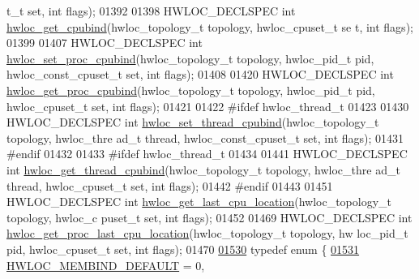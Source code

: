 \begin{DoxyCode}
      t\_t \textcolor{keyword}{set}, \textcolor{keywordtype}{int} flags);
01392 
01398 HWLOC\_DECLSPEC \textcolor{keywordtype}{int} \hyperlink{a00049_gab52f83ab16eac465da55e16bdd30df77}{hwloc_get_cpubind}(hwloc\_topology\_t topology, hwloc\_cpuset\_t \textcolor{keyword}{se
      t}, \textcolor{keywordtype}{int} flags);
01399 
01407 HWLOC\_DECLSPEC \textcolor{keywordtype}{int} \hyperlink{a00049_gac0ef3510b4e9c1273029ecf94e8c9686}{hwloc_set_proc_cpubind}(hwloc\_topology\_t topology, hwloc\_pid\_t 
      pid, hwloc\_const\_cpuset\_t \textcolor{keyword}{set}, \textcolor{keywordtype}{int} flags);
01408 
01420 HWLOC\_DECLSPEC \textcolor{keywordtype}{int} \hyperlink{a00049_gaa1373a002b9a0a87eb002e26c590f2da}{hwloc_get_proc_cpubind}(hwloc\_topology\_t topology, hwloc\_pid\_t 
      pid, hwloc\_cpuset\_t \textcolor{keyword}{set}, \textcolor{keywordtype}{int} flags);
01421 
01422 \textcolor{preprocessor}{#ifdef hwloc\_thread\_t}
01423 \textcolor{preprocessor}{}
01430 HWLOC\_DECLSPEC \textcolor{keywordtype}{int} \hyperlink{a00049_gaab65c34a0bc19c5a823f824543cedbd4}{hwloc_set_thread_cpubind}(hwloc\_topology\_t topology, hwloc\_thre
      ad\_t thread, hwloc\_const\_cpuset\_t \textcolor{keyword}{set}, \textcolor{keywordtype}{int} flags);
01431 \textcolor{preprocessor}{#endif}
01432 \textcolor{preprocessor}{}
01433 \textcolor{preprocessor}{#ifdef hwloc\_thread\_t}
01434 \textcolor{preprocessor}{}
01441 HWLOC\_DECLSPEC \textcolor{keywordtype}{int} \hyperlink{a00049_ga089cecfdb9a50e5c5cd1b6ff17352d42}{hwloc_get_thread_cpubind}(hwloc\_topology\_t topology, hwloc\_thre
      ad\_t thread, hwloc\_cpuset\_t \textcolor{keyword}{set}, \textcolor{keywordtype}{int} flags);
01442 \textcolor{preprocessor}{#endif}
01443 \textcolor{preprocessor}{}
01451 HWLOC\_DECLSPEC \textcolor{keywordtype}{int} \hyperlink{a00049_ga8e9a4b5ee3eaa18fd3a229790c6b5b17}{hwloc_get_last_cpu_location}(hwloc\_topology\_t topology, hwloc\_c
      puset\_t \textcolor{keyword}{set}, \textcolor{keywordtype}{int} flags);
01452 
01469 HWLOC\_DECLSPEC \textcolor{keywordtype}{int} \hyperlink{a00049_ga1e005ddb9701e6a993a9eb8abe67a710}{hwloc_get_proc_last_cpu_location}(hwloc\_topology\_t topology, hw
      loc\_pid\_t pid, hwloc\_cpuset\_t \textcolor{keyword}{set}, \textcolor{keywordtype}{int} flags);
01470 
\hypertarget{a00033_source_l01530}{}\hyperlink{a00050_gac9764f79505775d06407b40f5e4661e8}{01530} \textcolor{keyword}{typedef} \textcolor{keyword}{enum} \{
\hypertarget{a00033_source_l01531}{}\hyperlink{a00050_ggac9764f79505775d06407b40f5e4661e8a18675bb80ebc1bce5b652e9de8f3998c}{01531}   \hyperlink{a00050_ggac9764f79505775d06407b40f5e4661e8a18675bb80ebc1bce5b652e9de8f3998c}{HWLOC_MEMBIND_DEFAULT} =       0,      

\end{DoxyCode}
